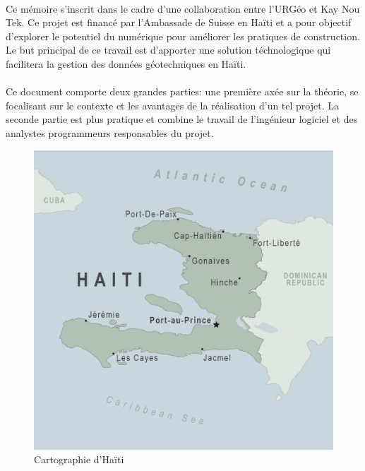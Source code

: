 
    \paragraph{}
    Ce mémoire s'inscrit dans le cadre d'une collaboration entre
    l'URGéo et Kay Nou Tek. Ce projet est financé par l’Ambassade
    de Suisse en Haïti et a pour objectif d’explorer le potentiel 
    du numérique pour améliorer les pratiques de construction.
    Le but principal de ce travail est
    d'apporter une solution téchnologique  qui facilitera la 
    gestion des données géotechniques en Haïti.
    \paragraph{}
    Ce document comporte deux grandes parties: une première axée
    sur la théorie, se focalisant sur le contexte et les avantages
    de la réalisation d'un tel projet. La seconde partie est plus pratique
    et combine le travail de l'ingénieur logiciel et des analystes programmeurs responsables
    du projet.
    \begin{figure}
        \centering
        \includegraphics[width=1\textwidth]{images/Contexte/map-haiti.png}
        \caption{Cartographie d'Haïti}
    \end{figure}